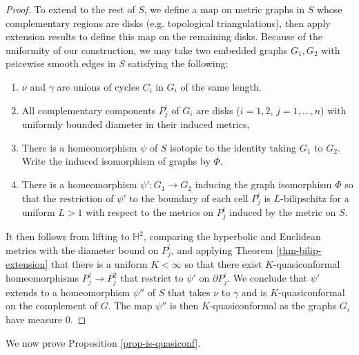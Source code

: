 \documentclass[12pt,a4paper]{amsart}
\newcommand{\bbH}{\mathbb H}
\theoremstyle{definition}
\theoremstyle{plain}
\numberwithin{equation}{section}
\begin{document}
\begin{proof}
    To extend to the rest of $S$, we define a map on metric graphs in $S$ whose complementary regions are disks (e.g. topological triangulations), then apply extension results to define this map on the remaining disks.
    Because of the uniformity of our construction, we may take two embedded graphs $G_1, G_2$ with peicewise smooth edges in $S$ satisfying the following:
    \begin{enumerate}
        \item $\nu$ and $\gamma$ are unions of cycles $C_i$ in $G_i$ of the same length. 
        \item All complementary components $P_j^i$ of $G_i$ are disks ($i = 1, 2$, $j = 1, ..., n$) with uniformly bounded diameter in their induced metrics,
        \item There is a homeomorphism $\psi$ of $S$ isotopic to the identity taking $G_1$ to $G_2$.
        Write the induced isomorphism of graphs by $\Phi$.
        \item There is a homeomorphism $\psi' : G_1 \to G_2$ inducing the graph isomorphism $\Phi$ so that the restriction of $\psi'$ to the boundary of each cell $P_j^i$ is $L$-bilipschitz for a uniform $L > 1$ with respect to the metrics on $P_j^i$ induced by the metric on $S$.
    \end{enumerate} 

    It then follows from lifting to $\bbH^2$, comparing the hyperbolic and Euclidean metrics with the diameter bound on $P_j^i$, and applying Theorem \ref{thm-bilip-extension} that there is a uniform $K < \infty$ so that there exist $K$-quasiconformal homeomorphisms $P_j^1 \to P_j^2$ that restrict to $\psi'$ on $\partial P_j^i$.
    We conclude that $\psi'$ extends to a homeomorphism $\psi''$ of $S$ that takes $\nu$ to $\gamma$ and is $K$-quasiconformal on the complement of $G$.
    The map $\psi''$ is then $K$-quasiconformal as the graphs $G_i$ have measure $0$.
\end{proof}

We now prove Proposition \ref{prop-is-quasiconf}.
\end{document}

